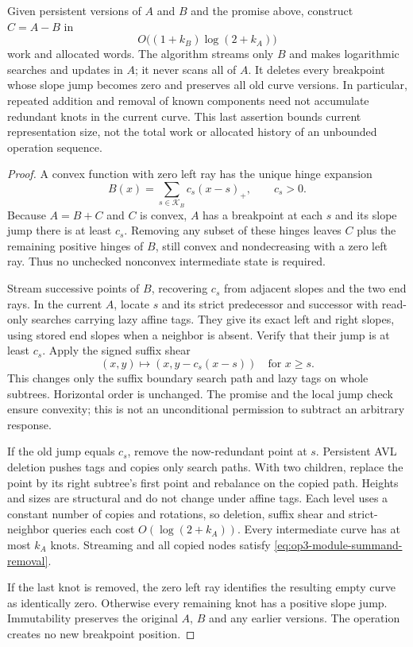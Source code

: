\begin{lemma}
\label{lem:op3-module-summand-removal}
Given persistent versions of $A$ and $B$ and the promise above, construct
$C=A-B$ in
\begin{equation}
 O\bigl((1+k_B)\log(2+k_A)\bigr)
 \label{eq:op3-module-summand-removal}
\end{equation}
work and allocated words. The algorithm streams only $B$ and makes
logarithmic searches and updates in $A$; it never scans all of $A$.
It deletes every breakpoint whose slope jump becomes zero and preserves
all old curve versions. In particular, repeated addition and removal of
known components need not accumulate redundant knots in the current curve.
This last assertion bounds current representation size, not the total
work or allocated history of an unbounded operation sequence.
\end{lemma}
\begin{proof}
A convex function with zero left ray has the unique hinge expansion
\[
 B(x)=\sum_{s\in\mathcal K_B}c_s(x-s)_+,\qquad c_s>0.
\]
Because $A=B+C$ and $C$ is convex, $A$ has a breakpoint at each $s$ and
its slope jump there is at least $c_s$. Removing any subset of these
hinges leaves $C$ plus the remaining positive hinges of $B$, still convex
and nondecreasing with a zero left ray. Thus no unchecked nonconvex
intermediate state is required.

Stream successive points of $B$, recovering $c_s$ from adjacent slopes
and the two end rays. In the current $A$, locate $s$ and its strict
predecessor and successor with read-only searches carrying lazy affine
tags. They give its exact left and right slopes, using stored end slopes
when a neighbor is absent. Verify that their jump is at least $c_s$.
Apply the signed suffix shear
\[
 (x,y)\longmapsto (x,y-c_s(x-s))\quad\text{for }x\geq s.
\]
This changes only the suffix boundary search path and lazy tags on
whole subtrees. Horizontal order is unchanged. The promise and the
local jump check ensure convexity; this is not an unconditional permission
to subtract an arbitrary response.

If the old jump equals $c_s$, remove the now-redundant point at $s$.
Persistent AVL deletion pushes tags and copies only search paths. With
two children, replace the point by its right subtree's first point and
rebalance on the copied path. Heights and sizes are structural and do
not change under affine tags. Each level uses a constant number of
copies and rotations, so deletion, suffix shear and strict-neighbor
queries each cost $O(\log(2+k_A))$. Every intermediate curve has at most
$k_A$ knots. Streaming and all copied nodes satisfy
\cref{eq:op3-module-summand-removal}.

If the last knot is removed, the zero left ray identifies the resulting
empty curve as identically zero. Otherwise every remaining knot has a
positive slope jump. Immutability preserves the original $A$, $B$ and
any earlier versions. The operation creates no new breakpoint position.
\end{proof}

